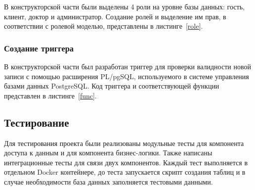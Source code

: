 В конструкторской части были выделены 4 роли на уровне базы данных: гость, клиент, доктор и администратор. Создание ролей и выделение им прав, в соответствии с ролевой моделью, представлены в листинге~\ref{role}. 


\subsubsection{Создание триггера}

В конструкторской части был разработан триггер для проверки валидности новой записи с помощью расширения PL/pgSQL, используемого в системе управления базами данных PostgreSQL. Код триггера и соответствующей функции представлен в листинге~\ref{func}. 


\subsection{Тестирование}

Для тестирования проекта были реализованы модульные тесты для компонента доступа к данным и для компонента бизнес-логики. Также написаны интеграционные тесты для связи двух компонентов. Каждый тест выполняется в отдельном Docker контейнере, до теста запускается скрипт создания таблиц и в случае необходимости база данных заполняется тестовыми данными. 

